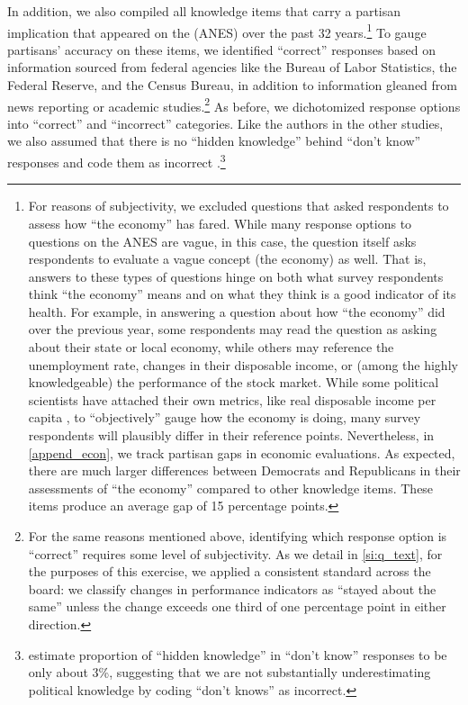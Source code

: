 \documentclass[12pt, letterpaper]{article}
\begin{document}
In addition, we also compiled all knowledge items that carry a partisan implication that appeared on the \citet{anes_gen} (ANES) over the past 32 years.\footnote{For reasons of subjectivity, we excluded questions that asked respondents to assess how ``the economy'' has fared. While many response options to questions on the ANES are vague, in this case, the question itself asks respondents to evaluate a vague concept (the economy) as well. That is, answers to these types of questions hinge on both what survey respondents think ``the economy'' means and on what they think is a good indicator of its health. For example, in answering a question about how ``the economy'' did over the previous year, some respondents may read the question as asking about their state or local economy, while others may reference the unemployment rate, changes in their disposable income, or (among the highly knowledgeable) the performance of the stock market. While some political scientists have attached their own metrics, like real disposable income per capita \citep[e.g.,][]{achen2016democracy,hibbs2000}, to ``objectively'' gauge how the economy is doing, many survey respondents will plausibly differ in their reference points. Nevertheless, in \ref{append_econ}, we track partisan gaps in economic evaluations. As expected, there are much larger differences between Democrats and Republicans in their assessments of ``the economy'' compared to other knowledge items. These items produce an average gap of 15 percentage points.}  To gauge partisans' accuracy on these items, we identified ``correct'' responses based on information sourced from federal agencies like the Bureau of Labor Statistics, the Federal Reserve, and the Census Bureau, in addition to information gleaned from news reporting or academic studies.\footnote{For the same reasons mentioned above, identifying which response option is ``correct'' requires some level of subjectivity. As we detail in \ref{si:q_text}, for the purposes of this exercise, we applied a consistent standard across the board: we classify changes in performance indicators as ``stayed about the same'' unless the change exceeds one third of one percentage point in either direction.} As before, we dichotomized response options into ``correct'' and ``incorrect'' categories. Like the authors in the other studies, we also assumed that there is no ``hidden knowledge'' behind ``don't know'' responses and code them as incorrect \citep{luskin2011don}.\footnote{\citet{luskin2011don} estimate proportion of ``hidden knowledge'' in ``don't know'' responses to be only about 3\%, suggesting that we are not substantially underestimating political knowledge by coding ``don't knows'' as incorrect.} 
\end{document}
